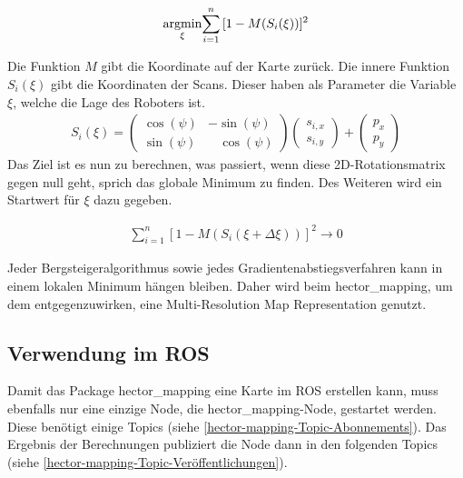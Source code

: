 \begin{align}
    \underset{\xi}{\operatorname*{argmin}} { \sum_{i=1}^n {[1 - M(S_{i}(\xi))]^{ 2 }} }
\end{align}

Die Funktion $ M $ gibt die Koordinate auf der Karte zurück. Die innere Funktion $ S_{i}(\xi) $ gibt die Koordinaten der Scans. Dieser haben als Parameter die Variable $ \xi $, welche die Lage des Roboters ist.
\begin{align}
    S_{i}(\xi) = \begin{pmatrix}
\cos(\psi) & -\sin(\psi)\\ 
\sin(\psi) & \ \ \ \ \cos(\psi)
\end{pmatrix} \begin{pmatrix}
s_{i,x}\\
s_{i,y}
\end{pmatrix} + \begin{pmatrix}
p_{x}\\
p_{y}
\end{pmatrix}
\end{align}
Das Ziel ist es nun zu berechnen, was passiert, wenn diese 2D-Rotationsmatrix gegen null geht, sprich das globale Minimum zu finden. Des Weiteren wird ein Startwert für $ \xi $ dazu gegeben.

\begin{align}
    \sum_{i=1}^n {[1 - M(S_{i}(\xi + \Delta\xi))]^{ 2 }} \to 0
\end{align}

Jeder Bergsteigeralgorithmus sowie jedes Gradientenabstiegsverfahren kann in einem lokalen Minimum hängen bleiben. Daher wird beim hector\_mapping, um dem entgegenzuwirken, eine Multi-Resolution Map Representation genutzt. \autocite{KohlbrecherMeyerStrykKlingaufFlexibleSlamSystem2011}

\subsection{Verwendung im \acl{ROS}} \label{rosVerwendungHectormapping}

Damit das Package hector\_mapping eine Karte im \ac{ROS} erstellen kann, muss ebenfalls nur eine einzige Node, die hector\_mapping-Node, gestartet werden. Diese benötigt einige Topics (siehe \autoref{hector-mapping-Topic-Abonnements}). Das Ergebnis der Berechnungen publiziert die Node dann in den folgenden Topics (siehe \autoref{hector-mapping-Topic-Veröffentlichungen}).

